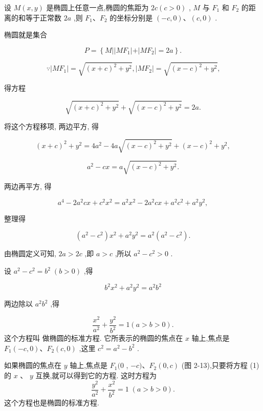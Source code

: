 \documentclass[lang=cn,newtx,12pt,scheme=chinese]{elegantbook}
\begin{document}
设 \(M\left( {x,y}\right)\) 是椭圆上任意一点,椭圆的焦距为 \({2c}\left( {c > 0}\right)\) , \(M\) 与 \({F}_{1}\) 和 \({F}_{2}\) 的距离的和等于正常数 \({2a}\) ,则 \({F}_{1}\text{、}{F}_{2}\) 的坐标分别是 \(\left( {-c,0}\right) \text{、}\left( {c,0}\right)\) .

椭圆就是集合

\[
  P = \left\{ {M\left| \right| M{F}_{1}\left| +\right| M{F}_{2} \mid = {2a}}\right\} .
\]

\[
  \because \left| {M{F}_{1}}\right| = \sqrt{{\left( x + c\right) }^{2} + {y}^{2}},\left| {M{F}_{2}}\right| = \sqrt{{\left( x - c\right) }^{2} + {y}^{2}}\text{,}
\]

得方程

\[
  \sqrt{{\left( x + c\right) }^{2} + {y}^{2}} + \sqrt{{\left( x - c\right) }^{2} + {y}^{2}} = {2a}.
\]

将这个方程移项, 两边平方, 得

\[
    {\left( x + c\right) }^{2} + {y}^{2} = 4{a}^{2} - {4a}\sqrt{{\left( x - c\right) }^{2} + {y}^{2}} + {\left( x - c\right) }^{2} + {y}^{2},
\]

\[
    {a}^{2} - {cx} = a\sqrt{{\left( x - c\right) }^{2} + {y}^{2}}.
\]

两边再平方, 得

\[
    {a}^{4} - 2{a}^{2}{cx} + {c}^{2}{x}^{2} = {a}^{2}{x}^{2} - 2{a}^{2}{cx} + {a}^{2}{c}^{2} + {a}^{2}{y}^{2},
\]

整理得

\[
  \left( {{a}^{2} - {c}^{2}}\right) {x}^{2} + {a}^{2}{y}^{2} = {a}^{2}\left( {{a}^{2} - {c}^{2}}\right) .
\]

由椭圆定义可知, \({2a} > {2c}\) ,即 \(a > c\) ,所以 \({a}^{2} - {c}^{2} > 0\) .

设 \({a}^{2} - {c}^{2} = {b}^{2}\;\left( {b > 0}\right)\) ,得

\[
    {b}^{2}{x}^{2} + {a}^{2}{y}^{2} = {a}^{2}{b}^{2}
\]

两边除以 \({a}^{2}{b}^{2}\) ,得

\begin{definition}[椭圆的标准方程] 
\[
  \frac{{x}^{2}}{{a}^{2}} + \frac{{y}^{2}}{{b}^{2}} = 1\left( {a > b > 0}\right) . \tag{1}
\]
这个方程叫 做椭圆的标准方程. 它所表示的椭圆的焦点在 \(x\) 轴上,焦点是 \({F}_{1}\left( {-c,0}\right) \text{、}{F}_{2}\left( {c,0}\right)\) ,这里 \({c}^{2} = {a}^{2} - {b}^{2}\) .
\end{definition}

\begin{corollary}[椭圆的标准方程2]
如果椭圆的焦点在 \(y\) 轴上,焦点是 \({F}_{1}(0\) , \(- c)\text{、}{F}_{2}\left( {0,c}\right)\) (图 2-13),只要将方程 (1) 的 \(x\) 、 \(y\) 互换,就可以得到它的方程. 这时方程为
\[
  \frac{{y}^{2}}{{a}^{2}} + \frac{{x}^{2}}{{b}^{2}} = 1\;\left( {a > b > 0}\right) .
\]
这个方程也是椭圆的标准方程.
\end{corollary}
\end{document}
